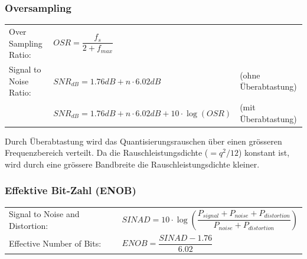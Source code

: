 \subsubsection{Oversampling}
  \begin{tabular}{lll}
    Over Sampling Ratio: &
    $OSR = \dfrac{f_s}{2+f_{max}}$ & \\
    
    Signal to Noise Ratio: &
    $SNR_{dB} = 1.76dB + n \cdot 6.02dB$ &
    (ohne Überabtastung)\\
    
    & $SNR_{dB} = 1.76dB + n \cdot 6.02dB + 10 \cdot \log (OSR)$ &
    (mit Überabtastung)
  \end{tabular}
  
  Durch Überabtastung wird das Quantisierungsrauschen über einen grösseren Frequenzbereich verteilt.
  Da die Rauschleistungsdichte ($=q^2/12$) konstant ist, wird durch eine grössere Bandbreite die
  Rauschleistungsdichte kleiner.
  
\subsubsection{Effektive Bit-Zahl (ENOB)}
  \begin{tabular}{lp{8cm}}
    Signal to Noise and Distortion: &
    $SINAD = 10 \cdot \log \left(\dfrac{P_{signal}+P_{noise}+P_{distortion}}{P_{noise}+P_{distortion}}\right)$ \\
    Effective Number of Bits: &
    $ENOB = \dfrac{SINAD-1.76}{6.02}$
  \end{tabular}

  
  


